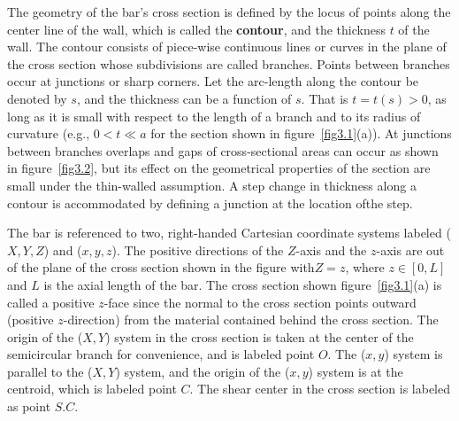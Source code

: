 \documentclass{AeroStructure-ERJohnson}
\begin{document}
The geometry of the bar's cross section is defined by the locus of points along the center line of the wall, which is called the \textbf{contour}, and the thickness $t$ of the wall. The contour consists of piece-wise continuous lines or curves in the plane of the cross section whose subdivisions are called branches. Points between branches occur at junctions or sharp corners. Let the arc-length along the contour be denoted by $s$, and the thickness can be a function of $s$. That is $t=t(s)>0$, as long as it is small with respect to the length of a branch and to its radius of curvature (e.g., $0<t \ll a$ for the section shown in figure~\ref{fig3.1}(a)). At junctions between branches overlaps and gaps of cross-sectional areas can occur as shown in figure~\ref{fig3.2}, but its effect on the geometrical properties of the section are small under the thin-walled assumption. A step change in thickness along a contour is accommodated by defining a junction at the location of\break the step.

The bar is referenced to two, right-handed Cartesian coordinate systems labeled ($X,Y,Z$) and ($x,y,z$). The positive directions of the $Z$-axis and the $z$-axis are out of the plane of the cross section shown in the figure with\break $Z = z$, where $z \in[0, L]$ and $L$ is the axial length of the bar. The cross section shown figure~\ref{fig3.1}(a) is called a positive $z$-face since the normal to the cross section points outward (positive $z$-direction) from the material contained behind the cross section. The origin of the ($X,Y$) system in the cross section is taken at the center of the semicircular branch for convenience, and is labeled point $O$. The ($x,y$) system is parallel to the ($X,Y$) system, and the origin of the ($x,y$) system is at the centroid, which is labeled point $C$. The shear center in the cross section is labeled as point $S.C$.
\end{document}
